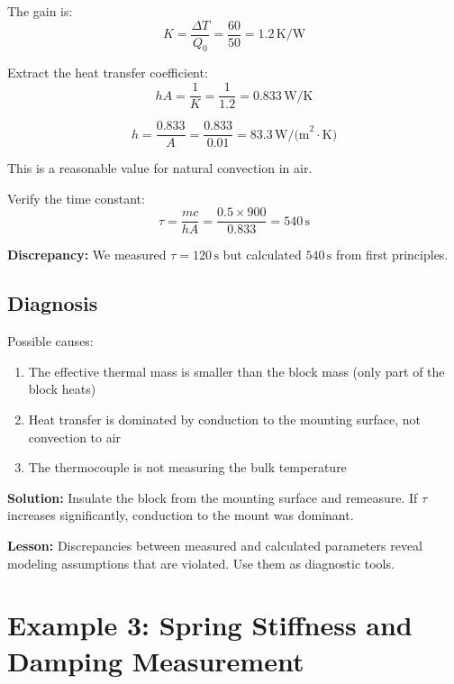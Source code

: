 The gain is:
\begin{equation}
K = \frac{\Delta T}{Q_0} = \frac{60}{50} = 1.2 \, \text{K/W}
\end{equation}

Extract the heat transfer coefficient:
\begin{equation}
hA = \frac{1}{K} = \frac{1}{1.2} = 0.833 \, \text{W/K}
\end{equation}

\begin{equation}
h = \frac{0.833}{A} = \frac{0.833}{0.01} = 83.3 \, \text{W/(m}^2\cdot\text{K)}
\end{equation}

This is a reasonable value for natural convection in air.

Verify the time constant:
\begin{equation}
\tau = \frac{mc}{hA} = \frac{0.5 \times 900}{0.833} = 540 \, \text{s}
\end{equation}

\textbf{Discrepancy:} We measured $\tau = 120 \, \text{s}$ but calculated $540 \, \text{s}$ from first principles.

\subsection{Diagnosis}

Possible causes:
\begin{enumerate}
    \item The effective thermal mass is smaller than the block mass (only part of the block heats)
    \item Heat transfer is dominated by conduction to the mounting surface, not convection to air
    \item The thermocouple is not measuring the bulk temperature
\end{enumerate}

\textbf{Solution:} Insulate the block from the mounting surface and remeasure. If $\tau$ increases significantly, conduction to the mount was dominant.

\textbf{Lesson:} Discrepancies between measured and calculated parameters reveal modeling assumptions that are violated. Use them as diagnostic tools.

\section{Example 3: Spring Stiffness and Damping Measurement}

